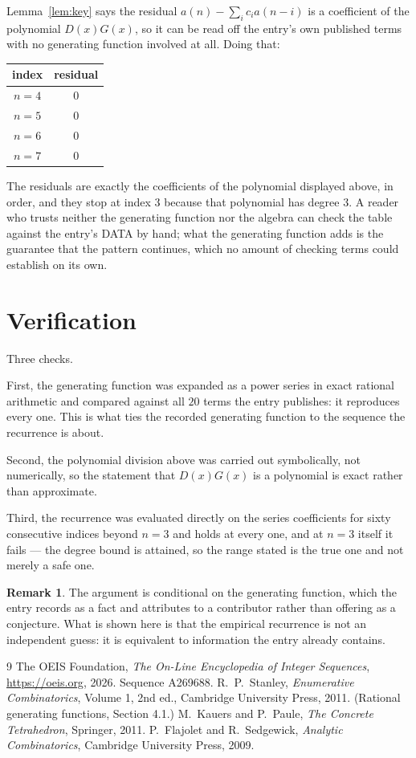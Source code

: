 \documentclass[11pt,a4paper]{article}
\theoremstyle{plain}
\theoremstyle{definition}
\newtheorem{remark}[theorem]{Remark}
\begin{document}
Lemma~\ref{lem:key} says the residual $a(n)-\sum_ic_ia(n-i)$ is a coefficient of the
polynomial $D(x)G(x)$, so it can be read off the entry's own published terms with no
generating function involved at all. Doing that:
\begin{center}
\begin{tabular}{cc}
index & residual \\ \hline
$n=4$ & $0$ \\
$n=5$ & $0$ \\
$n=6$ & $0$ \\
$n=7$ & $0$
\end{tabular}
\end{center}
The residuals are exactly the coefficients of the polynomial displayed above, in order, and
they stop at index $3$ because that polynomial has degree $3$. A reader who trusts
neither the generating function nor the algebra can check the table against the entry's DATA
by hand; what the generating function adds is the guarantee that the pattern continues, which
no amount of checking terms could establish on its own.

\section{Verification}

Three checks.

First, the generating function was expanded as a power series in exact rational arithmetic and
compared against all $20$ terms the entry publishes: it reproduces every one. This is
what ties the recorded generating function to the sequence the recurrence is about.

Second, the polynomial division above was carried out symbolically, not numerically, so the
statement that $D(x)G(x)$ is a polynomial is exact rather than approximate.

Third, the recurrence was evaluated directly on the series coefficients for sixty consecutive
indices beyond $n=3$ and holds at every one, and at $n=3$ itself it fails --- the
degree bound is attained, so the range stated is the true one and not merely a safe one.

\begin{remark}
The argument is conditional on the generating function, which the entry records as a fact and
attributes to a contributor rather than offering as a conjecture. What is shown here is that
the empirical recurrence is not an independent guess: it is equivalent to information the
entry already contains.
\end{remark}

\begin{thebibliography}{9}
 The OEIS Foundation, \emph{The On-Line Encyclopedia of Integer
Sequences}, \url{https://oeis.org}, 2026. Sequence A269688.
 R.~P.~Stanley, \emph{Enumerative Combinatorics}, Volume 1, 2nd ed.,
Cambridge University Press, 2011. (Rational generating functions, Section 4.1.)
 M.~Kauers and P.~Paule, \emph{The Concrete Tetrahedron}, Springer, 2011.
 P.~Flajolet and R.~Sedgewick, \emph{Analytic Combinatorics}, Cambridge
University Press, 2009.
\end{thebibliography}
\end{document}
